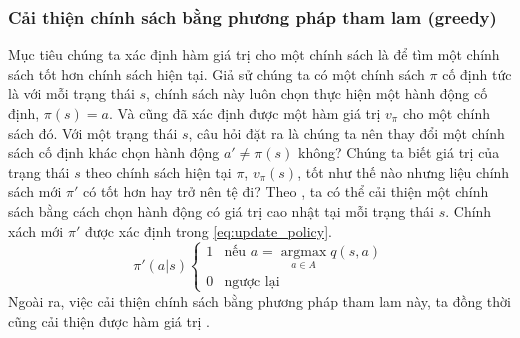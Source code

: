 \subsubsection{Cải thiện chính sách bằng phương pháp tham lam (greedy)}
Mục tiêu chúng ta xác định hàm giá trị cho một chính sách là để tìm một chính sách tốt hơn chính sách hiện tại. Giả sử chúng ta có một chính sách $\pi$ cố định tức là với mỗi trạng thái $s$, chính sách này luôn chọn thực hiện một hành động cố định, $\pi(s) = a$. Và cũng đã xác định được một hàm giá trị $v_{\pi}$ cho một chính sách đó. Với một trạng thái $s$, câu hỏi đặt ra là chúng ta nên thay đổi một chính sách cố định khác chọn hành động $a' \neq \pi(s)$ không? Chúng ta biết giá trị của trạng thái $s$ theo chính sách hiện tại $\pi$, $v_{\pi}(s)$, tốt như thế nào nhưng liệu chính sách mới $\pi'$ có tốt hơn hay trở nên tệ đi? Theo \cite{sutton1998introduction}, ta có thể cải thiện một chính sách bằng cách chọn hành động có giá trị cao nhật tại mỗi trạng thái $s$. Chính xách mới $\pi'$ được xác định trong \ref{eq:update_policy}.
\begin{equation}
\label{eq:update_policy}
\pi'(a|s)
\left\{\begin{matrix}
1 & \text{nếu }a = \underset{a \in A}{\operatorname{argmax}}q(s,a)\\ 
0 & \text{ngược lại}
\end{matrix}\right.
\end{equation}
Ngoài ra, việc cải thiện chính sách bằng phương pháp tham lam này, ta đồng thời cũng cải thiện được hàm giá trị \cite{sutton1998introduction}.
